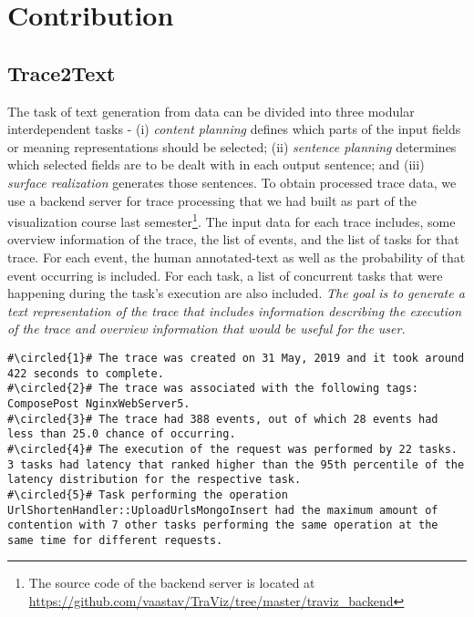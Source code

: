 \section{Contribution}
\label{sec:contribution}

\subsection{Trace2Text}

The task of text generation from data can be divided into 
three modular interdependent tasks - (i) \emph{content planning}
defines which parts of the input fields or meaning representations
should be selected; (ii) \emph{sentence planning} determines
which selected fields are to be dealt with in each output sentence;
and (iii) \emph{surface realization} generates those sentences.
To obtain processed trace data, we use a backend server
for trace processing that we had built as part of the visualization
course last semester\footnote{The source code of the backend server is located at \url{https://github.com/vaastav/TraViz/tree/master/traviz_backend}}.
The input data for each trace includes, some overview information of the trace,
the list of events, and the list of tasks for that trace. 
For each event, the human annotated-text as well as the probability of that event occurring
is included.
For each task, a list of concurrent tasks that were happening during the task's execution
are also included. \emph{The goal is to generate a text representation of the trace
that includes information describing the execution of the trace and overview information
that would be useful for the user.}

\begin{lstlisting}[caption={Annotated overview paragraph generated for a trace},captionpos=b,label={fig:trace_owtext}, escapechar=\#]
#\circled{1}# The trace was created on 31 May, 2019 and it took around 422 seconds to complete.
#\circled{2}# The trace was associated with the following tags: ComposePost NginxWebServer5.
#\circled{3}# The trace had 388 events, out of which 28 events had less than 25.0 chance of occurring.
#\circled{4}# The execution of the request was performed by 22 tasks. 3 tasks had latency that ranked higher than the 95th percentile of the latency distribution for the respective task. 
#\circled{5}# Task performing the operation UrlShortenHandler::UploadUrlsMongoInsert had the maximum amount of contention with 7 other tasks performing the same operation at the same time for different requests.
\end{lstlisting}

